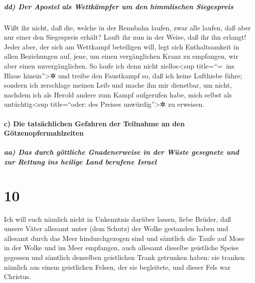 \hypertarget{dd-der-apostel-als-wettkuxe4mpfer-um-den-himmlischen-siegespreis}{%
\subparagraph{dd) Der Apostel als Wettkämpfer um den himmlischen
Siegespreis}\label{dd-der-apostel-als-wettkuxe4mpfer-um-den-himmlischen-siegespreis}}

 Wißt ihr nicht, daß die, welche in der Rennbahn laufen,
zwar alle laufen, daß aber nur einer den Siegespreis erhält? Lauft ihr
nun in der Weise, daß ihr ihn erlangt!  Jeder aber, der
sich am Wettkampf beteiligen will, legt sich Enthaltsamkeit in allen
Beziehungen auf, jene, um einen vergänglichen Kranz zu empfangen, wir
aber einen unvergänglichen.  So laufe ich denn nicht
ziellos\textless sup title=``=~ins Blaue hinein''\textgreater✲ und
treibe den Faustkampf so, daß ich keine Lufthiebe führe; 
sondern ich zerschlage meinen Leib und mache ihn mir dienstbar, um
nicht, nachdem ich als Herold andere zum Kampf aufgerufen habe, mich
selbst als untüchtig\textless sup title=``oder: des Preises
unwürdig''\textgreater✲ zu erweisen.

\hypertarget{c-die-tatsuxe4chlichen-gefahren-der-teilnahme-an-den-guxf6tzenopfermahlzeiten}{%
\paragraph{c) Die tatsächlichen Gefahren der Teilnahme an den
Götzenopfermahlzeiten}\label{c-die-tatsuxe4chlichen-gefahren-der-teilnahme-an-den-guxf6tzenopfermahlzeiten}}

\hypertarget{aa-das-durch-guxf6ttliche-gnadenerweise-in-der-wuxfcste-gesegnete-und-zur-rettung-ins-heilige-land-berufene-israel}{%
\subparagraph{aa) Das durch göttliche Gnadenerweise in der Wüste
gesegnete und zur Rettung ins heilige Land berufene
Israel}\label{aa-das-durch-guxf6ttliche-gnadenerweise-in-der-wuxfcste-gesegnete-und-zur-rettung-ins-heilige-land-berufene-israel}}

\hypertarget{section-9}{%
\section{10}\label{section-9}}

 Ich will euch nämlich nicht in Unkenntnis darüber lassen,
liebe Brüder, daß unsere Väter allesamt unter (dem Schutz) der Wolke
gestanden haben und allesamt durch das Meer hindurchgezogen sind
 und sämtlich die Taufe auf Mose in der Wolke und im Meer
empfangen,  auch allesamt dieselbe geistliche Speise
gegessen  und sämtlich denselben geistlichen Trank
getrunken haben: sie tranken nämlich aus einem geistlichen Felsen, der
sie begleitete, und dieser Fels war Christus.

